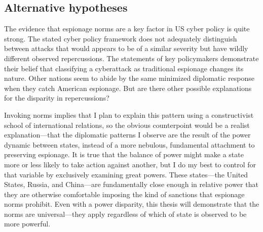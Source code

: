 \documentclass{memoir}
\begin{document}
\begin{refsegment}


\subsection{Alternative hypotheses}
The evidence that espionage norms are a key factor in US cyber policy is quite strong. The stated cyber policy framework does not adequately distinguish between attacks that would appears to be of a similar severity but have wildly different observed repercussions. The statements of key policymakers demonstrate their belief that classifying a cyberattack as traditional espionage changes its nature. Other nations seem to abide by the same minimized diplomatic response when they catch American espionage. But are there other possible explanations for the disparity in repercussions?

Invoking norms implies that I plan to explain this pattern using a constructivist school of international relations, so the obvious counterpoint would be a realist explanation---that the diplomatic patterns I observe are the result of the power dynamic between states, instead of a more nebulous, fundamental attachment to preserving espionage. It is true that the balance of power might make a state more or less likely to take action against another, but I do my best to control for that variable by exclusively examining great powers. These states---the United States, Russia, and China---are fundamentally close enough in relative power that they are otherwise comfortable imposing the kind of sanctions that espionage norms prohibit. Even with a power disparity, this thesis will demonstrate that the norms are universal---they apply regardless of which of state is observed to be more powerful.


\end{refsegment}
\end{document}
